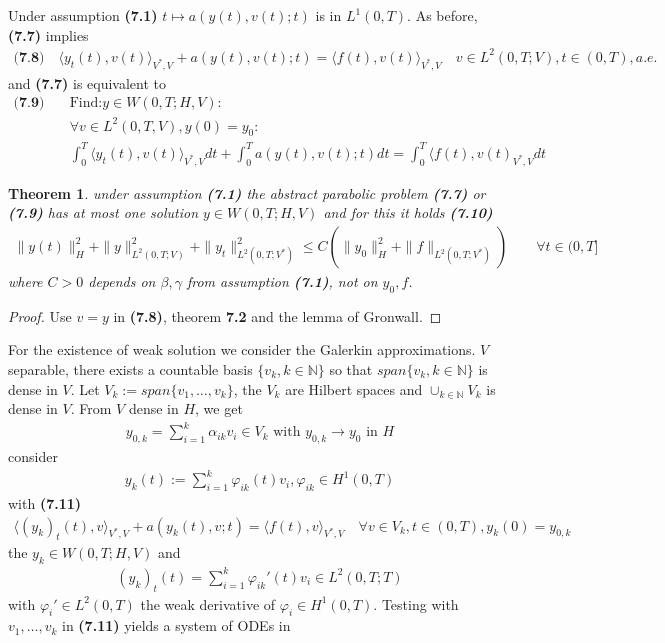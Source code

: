 \documentclass[a4paper,11pt,fleqn]{book}
\newtheorem{theorem}{Theorem}[section]
\theoremstyle{definition}
\theoremstyle{remark}
\begin{document}
Under assumption \textbf{(7.1)} $t \mapsto a(y(t), v(t); t)$ is in $L^1(0, T)$. As before, \textbf{(7.7)} implies 
\begin{align*} \textbf{(7.8)} \quad
	\langle y_t(t), v(t) \rangle_{V^*, V} + a(y(t), v(t); t) 
	= \langle f(t), v(t) \rangle_{V^*, V} \quad v \in L^2(0, T; V), t \in (0, T), a.e.
\end{align*} 
and \textbf{(7.7)} is equivalent to 
\begin{align*}\textbf{(7.9)}\quad
	&\text{Find:} y \in W(0, T; H, V):\\
	&\forall v \in L^2(0, T, V), y(0) = y_0:\\
	&\int_0^T \langle y_t(t), v(t) \rangle_{V^*, V} dt + \int_0^T a(y(t), v(t); t) dt = \int_0^T \langle f(t), v(t)_{V^*, V} dt
\end{align*}

\begin{theorem}
	under assumption \textbf{(7.1)} the abstract parabolic problem \textbf{(7.7)} or \textbf{(7.9)} has at most one solution $y \in W(0, T; H, V)$ and for this it holds \textbf{(7.10)}
	\begin{align*}
		\|y(t)\|_H^2 + \|y\|_{L^2(0, T; V)}^2 + \|y_t\|^2_{L^2(0, T;V^*)} \le 
		C (\|y_0\|_H^2 + \|f\|_{L^2(0, T; V^*)}) \qquad \forall t \in (0, T]
	\end{align*}
	where $C > 0$ depends on $\beta, \gamma $ from assumption \textbf{(7.1)}, not on $y_0, f$. 
\end{theorem}
\begin{proof}
	Use $v = y$ in \textbf{(7.8)}, theorem \textbf{7.2} and the lemma of Gronwall. 
\end{proof}

For the existence of weak solution we consider the Galerkin approximations. $V$ separable, there exists a countable basis $\{v_k, k \in \mathbb{N}\}$ so that $span\{v_k, k \in \mathbb{N}\}$ is dense in $V$. Let $V_k:=span\{v_1, \dots, v_k\}$, the $V_k$ are Hilbert spaces and $\cup_{k \in \mathbb{N}} V_k$ is dense in $V$. From $V$ dense in $H$, we get 
\begin{align*}
	y_{0, k} = \sum_{i = 1}^k \alpha_{ik} v_i \in V_k \text{ with }
	y_{0, k} \rightarrow y_0 \text{ in } H
\end{align*}
consider 
\begin{align*}
	y_k(t):= \sum_{i = 1}^k \varphi_{ik}(t)v_i, \varphi_{ik} \in H^1(0, T)
\end{align*}
with \textbf{(7.11)}
\begin{align*}
	\langle (y_k)_t(t), v \rangle_{V^*, V} + a (y_k(t), v;t) = \langle f(t), v \rangle_{V^*, V} \quad
	\forall v \in V_k, t \in (0, T), y_k(0) = y_{0, k}
\end{align*}
the $y_k \in W(0, T; H, V)$ and 
\begin{align*}
	(y_k)_t(t) = \sum_{i = 1}^k \varphi_{ik}'(t) v_i \in L^2(0, T;T)
\end{align*}
with $\varphi_i' \in L^2(0, T)$ the weak derivative of $\varphi_i \in H^1(0, T)$. Testing with $v_1, \dots, v_k$ in \textbf{(7.11)} yields a system of ODEs in 
\end{document}
